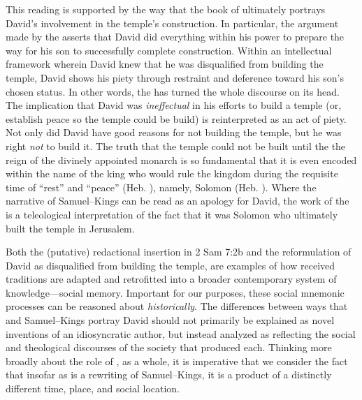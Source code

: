 This reading is supported by the way that the book of \chronicles ultimately portrays David's involvement in the temple's construction. In particular, the argument made by the \chronicler asserts that David did everything within his power to prepare the way for his son to successfully complete construction. Within an intellectual framework wherein David knew that he was disqualified from building the temple, David shows his piety through restraint and deference toward his son's chosen status. In other words, the \chronicler has turned the whole discourse on its head. The implication that David was \emph{ineffectual} in his efforts to build a temple (or, establish peace so the temple could be build) is reinterpreted as an act of piety. Not only did David have good reasons for not building the temple, but he was right \emph{not} to build it. The truth that the temple could not be built until the the reign of the divinely appointed monarch is so fundamental that it is even encoded within the name of the king who would rule the kingdom during the requisite time of ``rest'' and ``peace'' (Heb. ), namely, Solomon (Heb. ). Where the narrative of Samuel--Kings can be read as an apology for David, the work of the \chronicler is a teleological interpretation of the fact that it was Solomon who ultimately built the temple in Jerusalem.

Both the (putative) redactional insertion in 2 Sam 7:2b and the reformulation of David as disqualified from building the temple, are examples of how received traditions are adapted and retrofitted into a broader contemporary system of knowledge---social memory. Important for our purposes, these social mnemonic processes can be reasoned about \emph{historically}. The differences between ways that \chronicles and Samuel--Kings portray David should not primarily be explained as novel inventions of an idiosyncratic author, but instead analyzed as reflecting the social and theological discourses of the society that produced each. Thinking more broadly about the role of \chronicles, as a whole, it is imperative that we consider the fact that insofar as \chronicles is a rewriting of Samuel--Kings, it is a product of a distinctly different time, place, and social location.


